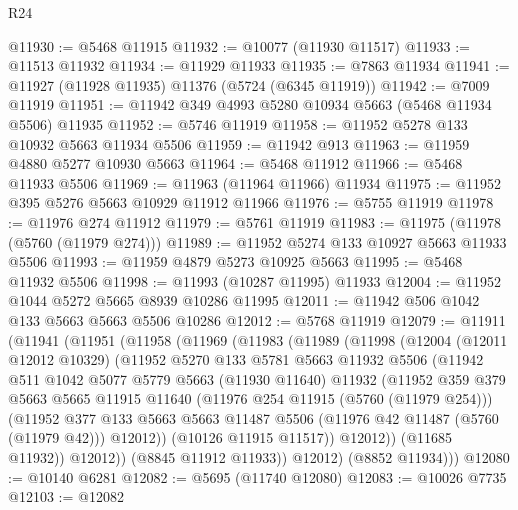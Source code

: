 \begin{lexlean}{R24}
\begin{coremodule}
@11930 := @5468 @11915
@11932 := @10077 (@11930 @11517)
@11933 := @11513 @11932
@11934 := @11929 @11933
@11935 := @7863 @11934
@11941 := @11927 (@11928 @11935) @11376 (@5724 (@6345 @11919))
@11942 := @7009 @11919
@11951 := @11942 @349 @4993 @5280 @10934 @5663 (@5468 @11934 @5506) @11935
@11952 := @5746 @11919
@11958 := @11952 @5278 @133 @10932 @5663 @11934 @5506
@11959 := @11942 @913
@11963 := @11959 @4880 @5277 @10930 @5663
@11964 := @5468 @11912
@11966 := @5468 @11933 @5506
@11969 := @11963 (@11964 @11966) @11934
@11975 := @11952 @395 @5276 @5663 @10929 @11912 @11966
@11976 := @5755 @11919
@11978 := @11976 @274 @11912
@11979 := @5761 @11919
@11983 := @11975 (@11978 (@5760 (@11979 @274)))
@11989 := @11952 @5274 @133 @10927 @5663 @11933 @5506
@11993 := @11959 @4879 @5273 @10925 @5663
@11995 := @5468 @11932 @5506
@11998 := @11993 (@10287 @11995) @11933
@12004 := @11952 @1044 @5272 @5665 @8939 @10286 @11995
@12011 := @11942 @506 @1042 @133 @5663 @5663 @5506 @10286
@12012 := @5768 @11919
@12079 := @11911
    (@11941
      (@11951
        (@11958
          (@11969
            (@11983
              (@11989
                (@11998
                  (@12004
                    (@12011 @12012 @10329)
                    (@11952
                      @5270
                      @133
                      @5781
                      @5663
                      @11932
                      @5506
                      (@11942
                        @511
                        @1042
                        @5077
                        @5779
                        @5663
                        (@11930 @11640)
                        @11932
                        (@11952
                          @359
                          @379
                          @5663
                          @5665
                          @11915
                          @11640
                          (@11976 @254 @11915 (@5760 (@11979 @254)))
                          (@11952
                            @377
                            @133
                            @5663
                            @5663
                            @11487
                            @5506
                            (@11976 @42 @11487 (@5760 (@11979 @42)))
                            @12012))
                        (@10126 @11915 @11517))
                      @12012))
                  (@11685 @11932))
                @12012))
            (@8845 @11912 @11933))
          @12012)
        (@8852 @11934)))
@12080 := @10140 @6281
@12082 := @5695 (@11740 @12080)
@12083 := @10026 @7735
@12103 := @12082

\end{coremodule}
\end{lexlean}
